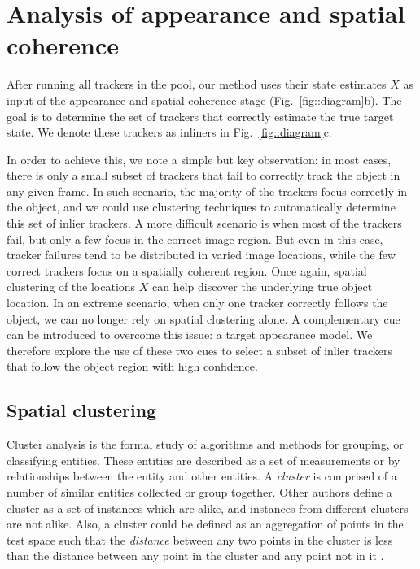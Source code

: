 \section{Analysis of appearance and spatial coherence}
After running all trackers in the pool, our method uses their state estimates
$X$ as input of the appearance and spatial coherence stage
(Fig.~\ref{fig::diagram}b). The goal is to determine the set of
trackers that correctly estimate the true target state. We denote these trackers
as inliners in Fig.~\ref{fig::diagram}c.

In order to achieve this, we note a simple but key observation: in most cases,
there is only a small subset of trackers that fail to correctly track the
object in any given frame.
In such scenario, the majority of the trackers focus correctly in the object,
and we could use \gls{clustering} techniques to automatically determine this set
of inlier trackers.
A more difficult scenario is when most of the trackers fail, but only a few
focus in the correct image region. But even in this case, tracker failures
tend to be distributed in varied image locations, while the few correct
trackers focus on a spatially coherent region. Once again, spatial clustering
of the locations $X$ can help discover the underlying true object location.
In an extreme scenario, when only one tracker correctly follows the object,
we can no longer rely on spatial clustering alone.
A complementary cue can be introduced to overcome this issue: a target
appearance model. We therefore explore the use of these two cues
to select a subset of inlier trackers that follow the object region with
high confidence.


\subsection{Spatial clustering}

Cluster analysis is the formal study of algorithms and methods for grouping, or
classifying entities. These entities are described as a set of measurements or by
relationships between the entity and other entities. A \textit{cluster} is
comprised of a number of similar entities collected or group together. Other
authors define a cluster as a set of instances which are alike, and instances from
different clusters are not alike. Also, a cluster could be defined as an 
aggregation of points in the test space such that the \textit{distance} between
any two points in the cluster is less than the distance between any point in the
cluster and any point not in it \cite{Jain88}.

